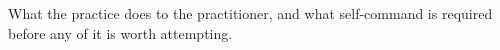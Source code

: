 
\begin{partblurb}
What the practice does to the practitioner, and what self-command is required before any of it is worth attempting.
\end{partblurb}
